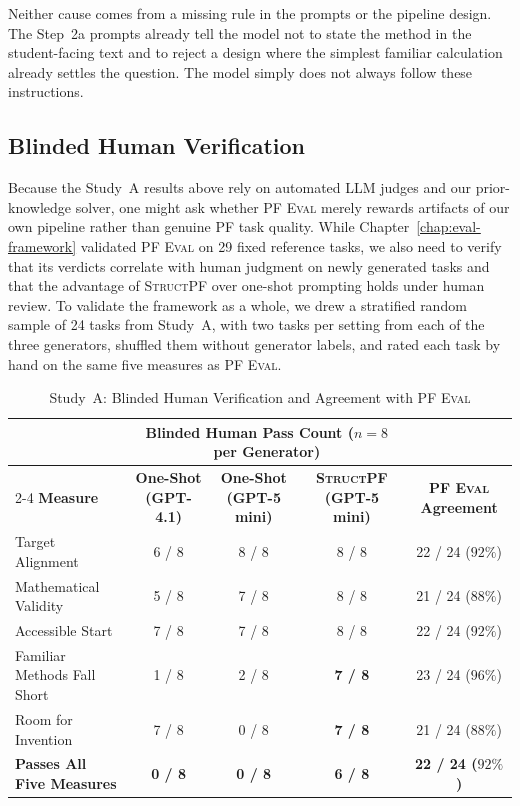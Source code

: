 Neither cause comes from a missing rule in the prompts or the pipeline design. The Step~2a prompts already tell the model not to state the method in the student-facing text and to reject a design where the simplest familiar calculation already settles the question. The model simply does not always follow these instructions.

\subsection{Blinded Human Verification}
\label{sec:res-human-eval}

Because the Study~A results above rely on automated LLM judges and our prior-knowledge solver, one might ask whether \textsc{PF Eval} merely rewards artifacts of our own pipeline rather than genuine PF task quality. While Chapter~\ref{chap:eval-framework} validated \textsc{PF Eval} on 29 fixed reference tasks, we also need to verify that its verdicts correlate with human judgment on newly generated tasks and that the advantage of \textsc{StructPF} over one-shot prompting holds under human review. To validate the framework as a whole, we drew a stratified random sample of 24 tasks from Study~A, with two tasks per setting from each of the three generators, shuffled them without generator labels, and rated each task by hand on the same five measures as \textsc{PF Eval}.

\begin{table}[!htb]
    \centering
    \caption[Study A: Blinded Human Verification and Agreement with \textsc{PF Eval}]{Study~A: Blinded Human Verification and Agreement with \textsc{PF Eval}}
    \label{tab:res-human-eval}
    \footnotesize
    \setlength{\tabcolsep}{2.8pt}
    \renewcommand{\arraystretch}{1.2}
    \begin{tabular}{@{} l c c c c @{}}
        \toprule
        & \multicolumn{3}{c}{\textbf{Blinded Human Pass Count ($n = 8$ per Generator)}} & \\
        \cmidrule(lr){2-4}
        \textbf{Measure} & \textbf{One-Shot (GPT-4.1)} & \textbf{One-Shot (GPT-5 mini)} & \textbf{\textsc{StructPF} (GPT-5 mini)} & \textbf{\textsc{PF Eval} Agreement} \\
        \midrule
        Target Alignment & 6 / 8 & 8 / 8 & 8 / 8 & 22 / 24 ($92\%$) \\
        Mathematical Validity & 5 / 8 & 7 / 8 & 8 / 8 & 21 / 24 ($88\%$) \\
        Accessible Start & 7 / 8 & 7 / 8 & 8 / 8 & 22 / 24 ($92\%$) \\
        Familiar Methods Fall Short & 1 / 8 & 2 / 8 & \textbf{7 / 8} & 23 / 24 ($96\%$) \\
        Room for Invention & 7 / 8 & 0 / 8 & \textbf{7 / 8} & 21 / 24 ($88\%$) \\
        \midrule
        \textbf{Passes All Five Measures} & \textbf{0 / 8} & \textbf{0 / 8} & \textbf{6 / 8} & \textbf{22 / 24 ($92\%$)} \\
        \bottomrule
    \end{tabular}
\end{table}

